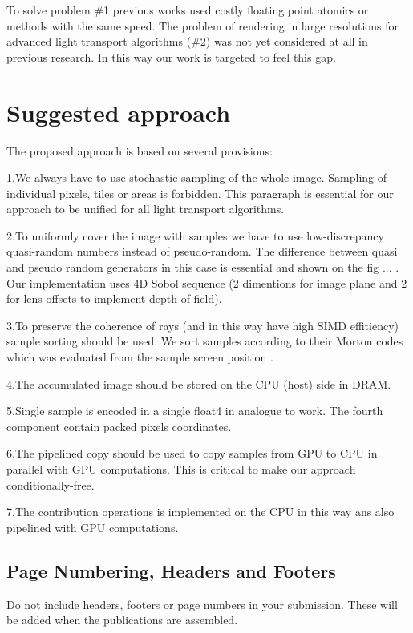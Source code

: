 \documentclass[twoside,twocolumn,10pt]{article}
\begin{document}
To solve problem \#1 previous works used costly floating point atomics or methods with the same speed. The problem of rendering in large resolutions for advanced light transport algorithms (\#2) was not yet considered at all in previous research. In this way our work is targeted to feel this gap.

\newpage
\section{Suggested approach}

The proposed approach is based on several provisions:

1.We always have to use stochastic sampling of the whole image. Sampling of individual pixels, tiles or areas is forbidden. This paragraph is essential for our approach to be unified for all light transport algorithms.

2.To uniformly cover the image with samples we have to use low-discrepancy quasi-random numbers instead of pseudo-random. The difference between quasi and pseudo random generators in this case is essential and shown on the fig ... . Our implementation uses 4D Sobol sequence \cite{Sobol67} (2 dimentions for image plane and 2 for lens offsets to implement depth of field).

3.To preserve the coherence of rays (and in this way have high SIMD effitiency) sample sorting should be used. We sort samples according to their Morton codes which was evaluated from the sample screen position \cite{Morton66}.

4.The accumulated image should be stored on the CPU (host) side in DRAM.

5.Single sample is encoded in a single float4 in analogue to \cite{MMLTGPU} work. The fourth component contain packed pixels coordinates.

6.The pipelined copy should be used to copy samples from GPU to CPU in parallel with GPU computations. This is critical to make our approach conditionally-free.

7.The contribution operations is implemented on the CPU in this way ans also pipelined with GPU computations.

\subsection*{Page Numbering, Headers and Footers}
Do not include headers, footers or page numbers in your submission. These will be added when the publications are assembled.
\end{document}
